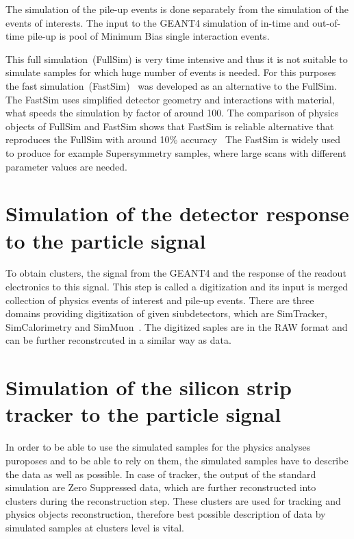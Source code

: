 The simulation of the pile-up events is done separately from the simulation of the events of interests. The input to  the GEANT4 simulation of in-time and out-of-time pile-up is pool of Minimum Bias single interaction events.

This full simulation~(FullSim) is very time intensive and thus it is not suitable to simulate samples for which huge number of events is needed. For this purposes the fast simulation~(FastSim)~\cite{Sekmen:2017hzs, CMS:2010spa, Giammanco:2014bza} was developed as an alternative to the FullSim. The FastSim uses simplified detector geometry and interactions with material, what speeds the simulation by factor of around 100. The comparison of physics objects of FullSim and FastSim shows that FastSim is reliable alternative that reproduces the FullSim with around 10\% accuracy~\cite{Abdullin:2011zz, Sekmen:2017hzs} The FastSim is widely used to produce for example Supersymmetry samples, where large scans with different parameter values are needed. 

\section{Simulation of the detector response to the particle signal}

To obtain clusters, the signal from the GEANT4 and the response of the readout electronics to this signal. This step is called a digitization and its input is merged collection of physics events of interest and pile-up events. There are three domains providing digitization of given siubdetectors, which are SimTracker, SimCalorimetry and SimMuon~\cite{iwebsite:simdigi}. The digitized saples are in the RAW format and can be further reconstrcuted in a similar way as data.

\section{Simulation of the silicon strip tracker to the particle signal}

In order to be able to use the simulated samples for the physics analyses puroposes and to be able to rely on them, the simulated samples have to describe the data as well as possible. In case of tracker, the output of the standard simulation are Zero Suppressed data, which are further reconstructed into clusters during the reconstruction step. These clusters are used for tracking and physics objects reconstruction, therefore best possible description of data by simulated samples at clusters level is vital.

